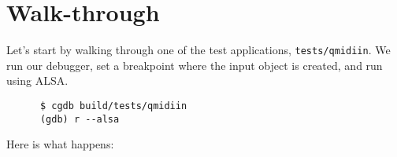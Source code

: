 %
%
%

\section{Walk-through}
\label{sec:walkthrough}

   Let's start by walking through one of the test applications,
   \texttt{tests/qmidiin}.  We run our debugger, set a breakpoint
   where the input object is created, and run using ALSA.

   \begin{verbatim}
      $ cgdb build/tests/qmidiin
      (gdb) r --alsa
   \end{verbatim}

   Here is what happens:

